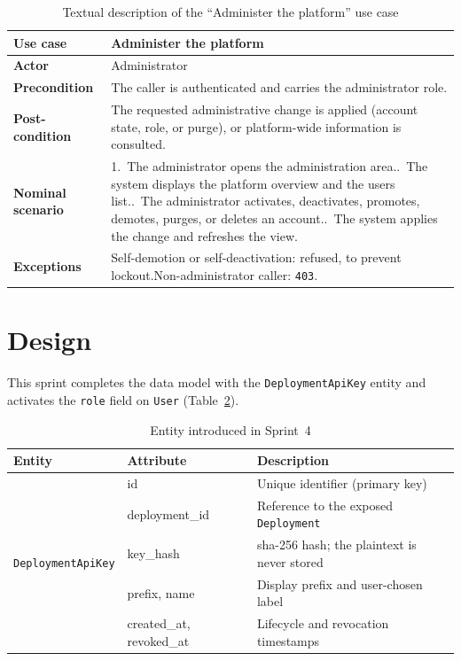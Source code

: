 \begin{table}[H]\centering
\renewcommand{\arraystretch}{1.3}
\caption{Textual description of the ``Administer the platform'' use case}\label{tab:uc-admin}
\begin{tabularx}{\textwidth}{|>{\bfseries}p{3.2cm}|X|}
\hline
Use case & Administer the platform\\ \hline
Actor & Administrator\\ \hline
Precondition & The caller is authenticated and carries the administrator role.\\ \hline
Post-condition & The requested administrative change is applied (account state, role, or purge), or platform-wide information is consulted.\\ \hline
Nominal scenario & 1.~The administrator opens the administration area.\newline 2.~The system displays the platform overview and the users list.\newline 3.~The administrator activates, deactivates, promotes, demotes, purges, or deletes an account.\newline 4.~The system applies the change and refreshes the view.\\ \hline
Exceptions & Self-demotion or self-deactivation: refused, to prevent lockout.\newline Non-administrator caller: \texttt{403}.\\ \hline
\end{tabularx}
\end{table}

\section{Design}
This sprint completes the data model with the \texttt{DeploymentApiKey} entity
and activates the \texttt{role} field on \texttt{User}
(Table~\ref{tab:entities-s4}).

\begin{table}[H]\centering
\renewcommand{\arraystretch}{1.25}
\caption{Entity introduced in Sprint~4}\label{tab:entities-s4}
\begin{tabularx}{\textwidth}{|l|l|X|}
\hline
\textbf{Entity} & \textbf{Attribute} & \textbf{Description}\\
\hline
\multirow{5}{*}{\texttt{DeploymentApiKey}}
 & id & Unique identifier (primary key)\\ \cline{2-3}
 & deployment\_id & Reference to the exposed \texttt{Deployment}\\ \cline{2-3}
 & key\_hash & \gls{sha}-256 hash; the plaintext is never stored\\ \cline{2-3}
 & prefix, name & Display prefix and user-chosen label\\ \cline{2-3}
 & created\_at, revoked\_at & Lifecycle and revocation timestamps\\
\hline
\end{tabularx}
\end{table}

